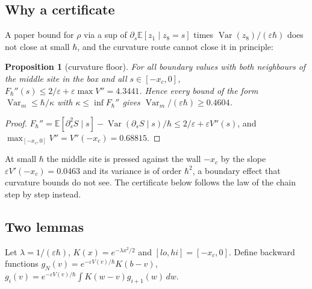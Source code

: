 \documentclass[11pt,a4paper]{article}
\newtheorem{proposition}[theorem]{Proposition}
\theoremstyle{definition}
\theoremstyle{remark}
\newcommand{\E}{\mathbb{E}}
\newcommand{\Var}{\operatorname{Var}}
\newcommand{\xc}{x_c}
\begin{document}
\subsection{Why a certificate}
A paper bound for $\rho$ via a sup of $\partial_s\E[z_1\mid z_8=s]$ times $\Var(z_8)/(\varepsilon\hbar)$ does not close at small $\hbar$, and the curvature route cannot close it in principle:

\begin{proposition}[curvature floor]\label{prop:N1}
For all boundary values with both neighbours of the middle site in the box and all $s\in[-\xc,0]$, $F_\hbar''(s)\le2/\varepsilon+\varepsilon\max V''=4.3441$. Hence every bound of the form $\Var_m\le\hbar/\kappa$ with $\kappa\le\inf F_\hbar''$ gives $\Var_m/(\varepsilon\hbar)\ge0.4604$.
\end{proposition}
\begin{proof}
$F_\hbar''=\E[\partial_s^2S\mid s]-\Var(\partial_sS\mid s)/\hbar\le2/\varepsilon+\varepsilon V''(s)$, and $\max_{[-\xc,0]}V''=V''(-\xc)=0.68815$.
\end{proof}
At small $\hbar$ the middle site is pressed against the wall $-\xc$ by the slope $\varepsilon V'(-\xc)=0.0463$ and its variance is of order $\hbar^2$, a boundary effect that curvature bounds do not see. The certificate below follows the law of the chain step by step instead.

\subsection{Two lemmas}
Let $\lambda=1/(\varepsilon\hbar)$, $K(x)=e^{-\lambda x^2/2}$ and $[lo,hi]=[-\xc,0]$. Define backward functions $g_N(v)=e^{-\varepsilon V(v)/\hbar}K(b-v)$, $g_i(v)=e^{-\varepsilon V(v)/\hbar}\int K(w-v)g_{i+1}(w)\,dw$.
\end{document}
